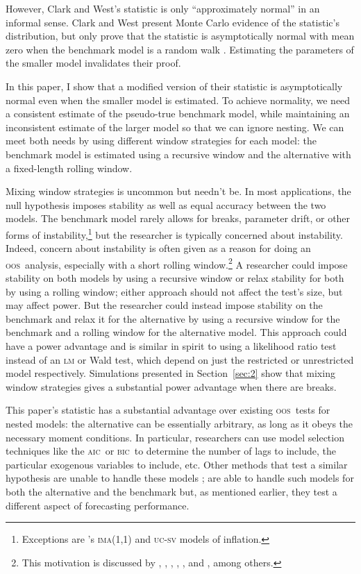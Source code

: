 \documentclass[12pt,fleqn]{article}
\newcommand\citepos[2][]{\citeauthor{#2}'s \citeyearpar[#1]{#2}}
\theoremstyle{definition}
\newcommand{\aic}{\textsc{aic}}
\newcommand{\bic}{\textsc{bic}}
\newcommand{\oos}{\textsc{oos}}
\begin{document}
However, Clark and West's statistic is only ``approximately normal''
in an informal sense.  Clark and West present Monte Carlo evidence of
the statistic's distribution, but only prove that the statistic is
asymptotically normal with mean zero when the benchmark model is a
random walk \citep{ClW:06}. Estimating the parameters of the smaller
model invalidates their proof.

In this paper, I show that a modified version of their statistic is
asymptotically normal even when the smaller model is estimated.  To
achieve normality, we need a consistent estimate of the pseudo-true
benchmark model, while maintaining an inconsistent estimate of the
larger model so that we can ignore nesting.  We can meet both needs by
using different window strategies for each model: the benchmark model
is estimated using a recursive window and the alternative with a
fixed-length rolling window.

Mixing window strategies is uncommon but needn't be. In most
applications, the null hypothesis imposes stability as well as equal
accuracy between the two models.  The benchmark model rarely allows
for breaks, parameter drift, or other forms of
instability,\footnote{Exceptions are \citepos{StW:07}
  \textsc{ima}(1,1) and \textsc{uc-sv} models of inflation.} but the
researcher is typically concerned about instability.  Indeed, concern
about instability is often given as a reason for doing an \oos\
analysis, especially with a short rolling window.\footnote{This
  motivation is discussed by \citet{StW:03}, \citet{PeT:05,PeT:07},
  \cite{GiW:06}, \citet{GoW:08}, \citet{ClM:09c}, and
  \cite{GiR:09,GiR:10}, among others.} A researcher could impose
stability on both models by using a recursive window or relax
stability for both by using a rolling window; either approach should
not affect the test's size, but may affect power.  But the researcher
could instead impose stability on the benchmark and relax it for the
alternative by using a recursive window for the benchmark and a
rolling window for the alternative model.  This approach could have a
power advantage and is similar in spirit to using a likelihood ratio
test instead of an \textsc{lm} or Wald test, which depend on just the
restricted or unrestricted model respectively.  Simulations presented
in Section~\ref{sec:2} show that mixing window strategies gives a
substantial power advantage when there are breaks.

This paper's statistic has a substantial advantage over existing \oos\
tests for nested models: the alternative can be essentially arbitrary,
as long as it obeys the necessary moment conditions.  In particular,
researchers can use model selection techniques like the \aic\ or \bic\
to determine the number of lags to include, the particular exogenous
variables to include, etc.  Other methods that test a similar
hypothesis are unable to handle these models \citep[except][which does
not allow the benchmark to be estimated]{ClW:06}; \citet{GiW:06} are
able to handle such models for both the alternative and the benchmark
but, as mentioned earlier, they test a different aspect of forecasting
performance.
\end{document}
